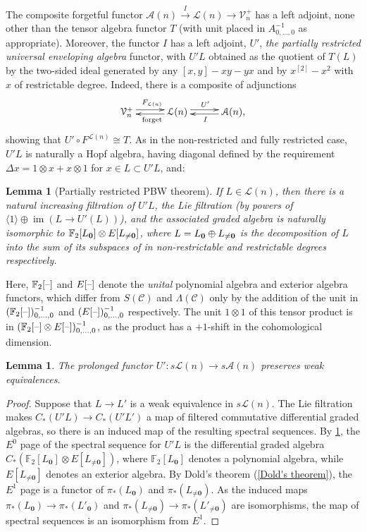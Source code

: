 \documentclass[11pt]{amsart}
\theoremstyle{plain}
\newtheorem{lem}[thm]{Lemma}
\theoremstyle{definition}
\DeclareMathOperator{\im}{im}
\newcommand{\DASH}{\textup{--}}
\renewcommand{\to}{\longrightarrow}
\newcommand{\scrC}{\mathscr{C}}
\newcommand{\calA}{\mathcal{A}}
\newcommand{\calL}{\mathcal{L}}
\newcommand{\calV}{\mathcal{V}}
\theoremstyle{plain}
\newcommand{\CommOperad}{{\scrC}}
\newcommand{\restn}[1]{#1^{[2]}}
\newcommand{\vect}[2]{\calV^{#1}_{#2}}
\newcommand{\UEA}{U'}%
\newcommand{\F}{\mathbb{F}}
\begin{document}
\begin{appendices}
The composite forgetful functor $\calA(n)\overset{I}{\to}\calL(n)\to\vect{+}{n}$ has a left adjoint, none other than the tensor algebra functor $T$ (with unit placed in $A^{-1}_{0,\ldots,0}$ as appropriate). Moreover, the functor $I$ has a left adjoint, $\UEA$, \emph{the partially restricted universal enveloping algebra} functor, with $\UEA L$ obtained as the quotient of $T(L)$ by the two-sided ideal generated by any $[x,y]-xy-yx$ and by $\restn{x}-x^2$ with $x$ of restrictable degree. Indeed, there is a composite of adjunctions
\[\xymatrix@R=.3cm@C=1cm{
\vect{+}{n}  \ar@<.6ex>[r]^{F_{\calL(n)}}&
\calL(n)  \ar@<.4ex>[l]^{\textup{forget}} \ar@<.6ex>[r]^{\UEA}&
\calA(n),  \ar@<.4ex>[l]^{I} 
}
\]
showing that $\UEA\circ F^{\calL(n)}\cong T$. As in the non-restricted and fully restricted case, $\UEA L$ is naturally a Hopf algebra, having diagonal defined by the requirement $\Delta x=1\otimes x+x\otimes 1$ for $x\in L\subset \UEA L$, and:
\begin{lem}[Partially restricted PBW theorem]\label{Partially restricted PBW theorem}
If $L\in\calL(n)$, then there is a natural increasing filtration of $\UEA L$, the Lie filtration (by powers of $\langle 1\rangle\oplus \im(L\to \UEA(L))$), and the associated graded algebra is naturally isomorphic to $\F_2[L_{\textup{\textbf{0}}}]\otimes E[L_{\neq\textup{\textbf{0}}}]$, where $L=L_{\textbf{\textup{0}}}\oplus L_{\neq\textbf{\textup{0}}}$ is the decomposition of $L$ into the sum of its subspaces of in non-restrictable and restrictable degrees respectively.
\end{lem}
Here, $\F_2[\DASH]$ and $E[\DASH]$ denote the \emph{unital} polynomial algebra and exterior algebra functors, which differ from $S(\CommOperad)$ and $\Lambda(\CommOperad)$ only by the addition of the unit in $(\F_2[\DASH])^{-1}_{0,\ldots,0}$ and $(E[\DASH])^{-1}_{0,\ldots,0}$ respectively. The unit $1\otimes1 $ of this tensor product is in $(\F_2[\DASH]\otimes E[\DASH])^{-1}_{0,\ldots,0}$, as the product has a $+1$-shift in the cohomological dimension.
\begin{lem}
The prolonged functor $\UEA:s\calL(n)\to s\calA(n)$ preserves weak equivalences.
\end{lem}
\begin{proof}
Suppose that $L\to L'$ is a weak equivalence in $s\calL(n)$. The Lie filtration makes $C_*(\UEA L)\to C_*(\UEA L')$ a map of filtered commutative differential graded algebras, so there is an induced map of the resulting spectral sequences. By \ref{Partially restricted PBW theorem}, the $E^0$ page of the spectral sequence for $\UEA L$ is the differential graded algebra $C_*(\F_2[L_{\textbf{0}}]\otimes E[L_{\neq\textbf{0}}])$, where $\F_2[L_{\textbf{0}}]$ denotes a polynomial algebra, while $E[L_{\neq\textbf{0}}]$ denotes an exterior algebra. By Dold's theorem (\ref{Dold's theorem}), the $E^1$ page is a functor of $\pi_*(L_{\textbf{0}})$ and $\pi_*(L_{\neq\textbf{0}})$. As the induced maps $\pi_*(L_{\textbf{0}})\to\pi_*(L'_{\textbf{0}})$ and $\pi_*(L_{\neq\textbf{0}})\to\pi_*(L'_{\neq\textbf{0}})$ are isomorphisms, the map of spectral sequences is an isomorphism from $E^1$.
\end{proof}


\end{appendices}
\end{document}
